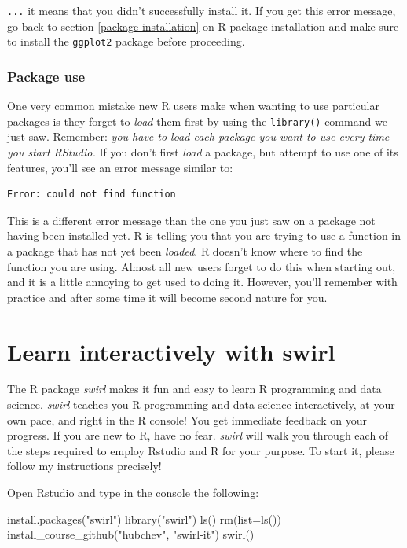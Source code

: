 \documentclass[
  12pt,
  oneside]{book}
\newenvironment{Shaded}{\begin{snugshade}}{\end{snugshade}}
\newcommand{\AttributeTok}[1]{\textcolor[rgb]{0.77,0.63,0.00}{#1}}
\newcommand{\FunctionTok}[1]{\textcolor[rgb]{0.00,0.00,0.00}{#1}}
\newcommand{\NormalTok}[1]{#1}
\newcommand{\StringTok}[1]{\textcolor[rgb]{0.31,0.60,0.02}{#1}}
\begin{document}
\texttt{...} it means that you didn't successfully install it. If you get this error message, go back to section \ref{package-installation} on R package installation and make sure to install the \texttt{ggplot2} package before proceeding.

\hypertarget{package-use}{%
\subsection{Package use}\label{package-use}}

One very common mistake new R users make when wanting to use particular packages is they forget to \emph{load} them first by using the \texttt{library()} command we just saw. Remember: \emph{you have to load each package you want to use every time you start RStudio.} If you don't first \emph{load} a package, but attempt to use one of its features, you'll see an error message similar to:

\begin{verbatim}
Error: could not find function
\end{verbatim}

This is a different error message than the one you just saw on a package not having been installed yet. R is telling you that you are trying to use a function in a package that has not yet been \emph{loaded}. R doesn't know where to find the function you are using. Almost all new users forget to do this when starting out, and it is a little annoying to get used to doing it. However, you'll remember with practice and after some time it will become second nature for you.

\hypertarget{learn-interactively-with-swirl}{%
\chapter{Learn interactively with swirl}\label{learn-interactively-with-swirl}}

The R package \emph{swirl} makes it fun and easy to learn R programming and data science.
\emph{swirl} teaches you R programming and data science interactively, at your own pace,
and right in the R console! You get immediate feedback on your progress.
If you are new to R, have no fear. \emph{swirl} will walk you through each of the steps
required to employ Rstudio and R for your purpose.
To start it, please follow my instructions precisely!

Open Rstudio and type in the console the following:

\begin{Shaded}
\begin{Highlighting}[]
\FunctionTok{install.packages}\NormalTok{(}\StringTok{"swirl"}\NormalTok{)}
\FunctionTok{library}\NormalTok{(}\StringTok{"swirl"}\NormalTok{)}
\FunctionTok{ls}\NormalTok{()}
\FunctionTok{rm}\NormalTok{(}\AttributeTok{list=}\FunctionTok{ls}\NormalTok{())}
\FunctionTok{install\_course\_github}\NormalTok{(}\StringTok{"hubchev"}\NormalTok{, }\StringTok{"swirl{-}it"}\NormalTok{)}
\FunctionTok{swirl}\NormalTok{()}
\end{Highlighting}
\end{Shaded}
\end{document}
